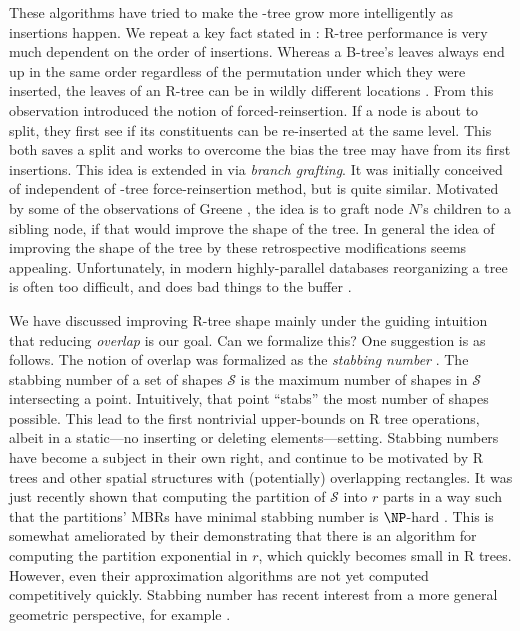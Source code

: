 These algorithms have tried to make the \rbase-tree grow more intelligently as insertions happen.
We repeat a key fact stated in \cite{beckmannkriegelschneiderseeger90}: R-tree performance is very much dependent on the order of insertions.
Whereas a B-tree's leaves always end up in the same order regardless of the permutation under which they were inserted, the leaves of an R-tree can be in wildly different locations \cite{gaedegunther98,beckmannkriegelschneiderseeger90,argeberghaverkortyi04}.
From this observation \cite{beckmannkriegelschneiderseeger90} introduced the notion of forced-reinsertion.
If a node is about to split, they first see if its constituents can be re-inserted at the same level.
This both saves a split and works to overcome the bias the tree may have from its first insertions.
This idea is extended in \cite{schrekchen00} via \emph{branch grafting}.
It was initially conceived of independent of \rstar-tree force-reinsertion method, but is quite similar.
Motivated by some of the observations of Greene \cite{greene89}, the idea is to graft node $N$'s children to a sibling node, if that would improve the shape of the tree.
In general the idea of improving the shape of the tree by these retrospective modifications seems appealing.
Unfortunately, in modern highly-parallel databases reorganizing a tree is often too difficult, and does bad things to the buffer \cite{beckmannseeger09}.

We have discussed improving R-tree shape mainly under the guiding intuition that reducing \emph{overlap} is our goal.
Can we formalize this?
One suggestion is as follows.
The notion of overlap was formalized as the \emph{stabbing number} \cite{berggudmundssonhammarovermars00}.
The stabbing number of a set of shapes $\mathcal S$ is the maximum number of shapes in $\mathcal S$ intersecting a point.
Intuitively, that point ``stabs'' the most number of shapes possible.
This lead to the first nontrivial upper-bounds on R tree operations, albeit in a static---no inserting or deleting elements---setting.
Stabbing numbers have become a subject in their own right, and continue to be motivated by R trees and other spatial structures with (potentially) overlapping rectangles.
It was just recently shown that computing the partition of $\mathcal S$ into $r$ parts in a way such that the partitions' MBRs have minimal stabbing number is $\NP$-hard \cite{bergkhosraviverdonschotweele11}.
This is somewhat ameliorated by their demonstrating that there is an algorithm for computing the partition exponential in $r$, which quickly becomes small in R trees.
However, even their approximation algorithms are not yet computed competitively quickly.
Stabbing number has recent interest from a more general geometric perspective, for example \cite{durochermehrabi12}.

